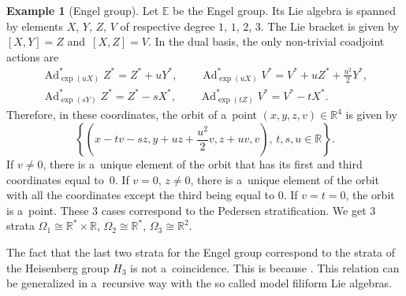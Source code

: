 \documentclass[pdftex]{sigma}
\newcommand{\R}{\mathbb R} %
\newcommand{\Ad}{\operatorname{Ad}} %
\numberwithin{equation}{section}
\theoremstyle{definition}
\newtheorem{ex}[thm]{Example}
\begin{document}
\begin{ex}[Engel group] \label{Ex: Engel group}
 Let $\mathbb{E}$ be the Engel group. Its Lie algebra is spanned by elements $X$, $Y$, $Z$, $V$ of respective degree $1$, $1$, $2$, $3$. The Lie bracket is given by $[X,Y] = Z$ and~${[X,Z] = V}$. In the dual basis, the only non-trivial coadjoint actions are
 \begin{gather*}
 \Ad^*_{\exp(uX)}Z^* = Z^* + uY^*,\qquad
 \Ad^*_{\exp(uX)}V^* = V^* + uZ^* + \frac{u^2}{2}Y^* ,\\
 \Ad^*_{\exp(sY)}Z^* = Z^* - sX^*,\qquad
 \Ad^*_{\exp(tZ)}V^* = V^*-tX^*.
 \end{gather*}
 Therefore, in these coordinates, the orbit of a~point $(x,y,z,v) \in \R^4$ is given by
 \[\left\lbrace \left(x-tv-sz,y+uz+\frac{u^2}{2}v,z+uv,v\right),\, t,s,u\in \R\right\rbrace.\]
 If $v \neq 0$, there is a~unique element of the orbit that has its first and third coordinates equal to~0. If $v = 0$, $z \neq 0$, there is a~unique element of the orbit with all the coordinates except the third being equal to 0. If $v=t=0$, the orbit is a~point. These 3 cases correspond to the Pedersen stratification. We get 3 strata $\Omega_1 \cong \R^* \times \R$, $\Omega_2 \cong \R^*$, $\Omega_3 \cong \R^2$.
\end{ex}

The fact that the last two strata for the Engel group correspond to the strata of the Heisenberg group $H_3$ is not a~coincidence. This is because . This relation can be generalized in a~recursive way with the so called model filiform Lie algebras.
\end{document}
